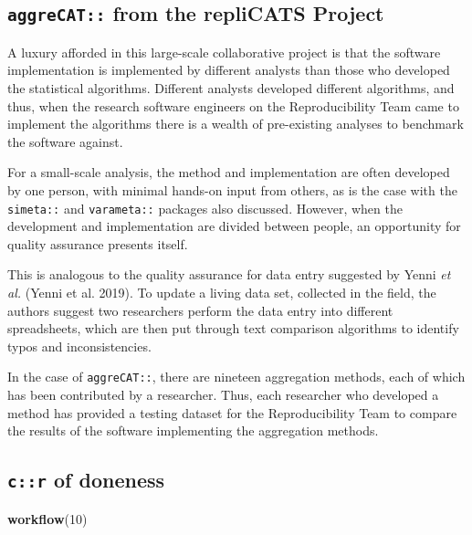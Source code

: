 \documentclass[
]{article}
\newenvironment{Shaded}{\begin{snugshade}}{\end{snugshade}}
\newcommand{\DecValTok}[1]{\textcolor[rgb]{0.00,0.00,0.81}{#1}}
\newcommand{\KeywordTok}[1]{\textcolor[rgb]{0.13,0.29,0.53}{\textbf{#1}}}
\newcommand{\NormalTok}[1]{#1}
\begin{document}
\hypertarget{aggrecat-from-the-replicats-project}{%
\subsection{\texorpdfstring{\texttt{aggreCAT::} from the repliCATS
Project}{aggreCAT:: from the repliCATS Project}}\label{aggrecat-from-the-replicats-project}}

A luxury afforded in this large-scale collaborative project is that the
software implementation is implemented by different analysts than those
who developed the statistical algorithms. Different analysts developed
different algorithms, and thus, when the research software engineers on
the Reproducibility Team came to implement the algorithms there is a
wealth of pre-existing analyses to benchmark the software against.

For a small-scale analysis, the method and implementation are often
developed by one person, with minimal hands-on input from others, as is
the case with the \texttt{simeta::} and \texttt{varameta::} packages
also discussed. However, when the development and implementation are
divided between people, an opportunity for quality assurance presents
itself.

This is analogous to the quality assurance for data entry suggested by
Yenni \emph{et al.} (Yenni et al. 2019). To update a living data set,
collected in the field, the authors suggest two researchers perform the
data entry into different spreadsheets, which are then put through text
comparison algorithms to identify typos and inconsistencies.

In the case of \texttt{aggreCAT::}, there are nineteen aggregation
methods, each of which has been contributed by a researcher. Thus, each
researcher who developed a method has provided a testing dataset for the
Reproducibility Team to compare the results of the software implementing
the aggregation methods.

\hypertarget{cr-of-doneness}{%
\subsection{\texorpdfstring{\texttt{c::r} of
doneness}{c::r of doneness}}\label{cr-of-doneness}}

\begin{Shaded}
\begin{Highlighting}[]
\KeywordTok{workflow}\NormalTok{(}\DecValTok{10}\NormalTok{)}
\end{Highlighting}
\end{Shaded}
\end{document}
